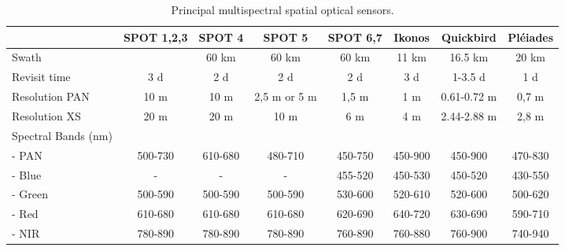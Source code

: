 \begin{table}
\begin{center}

\begin{small}
\begin{tabular}{l|c|c|c|c|c|c|c}


& \textbf{SPOT 1,2,3} & \textbf{SPOT 4} & \textbf{SPOT 5} & \textbf{SPOT 6,7} & \textbf{Ikonos} & \textbf{Quickbird} &\textbf{Pléiades} \\
\hline
%
Swath & & 60 km & 60 km & 60 km & 11 km & 16.5 km & 20 km \\
%
Revisit time & 3 d & 2 d & 2 d & 2 d & 3 d & 1-3.5 d & 1 d \\
%
Resolution PAN & 10 m & 10 m & 2,5 m or 5 m & 1,5 m & 1 m & 0.61-0.72 m & 0,7 m \\
%
Resolution XS & 20 m & 20 m & 10 m & 6 m & 4 m & 2.44-2.88 m & 2,8 m \\
%
Spectral Bands (nm) & & & & & & \\
%
- PAN & 500-730 & 610-680 & 480-710 & 450-750 & 450-900 & 450-900 & 470-830 \\
%
- Blue & - & - & - & 455-520 & 450-530 & 450-520 & 430-550 \\
%
- Green & 500-590 & 500-590 & 500-590 & 530-600 & 520-610 & 520-600 & 500-620 \\
%
- Red & 610-680 & 610-680 & 610-680 & 620-690 & 640-720 & 630-690 & 590-710 \\
%
- NIR & 780-890 & 780-890 & 780-890 & 760-890 & 760-880 & 760-900 & 740-940 \\
\end{tabular}
\end{small}
\end{center}
\caption{Principal multispectral spatial optical sensors.}
\label{table:spatial_satellites}
\end{table}

